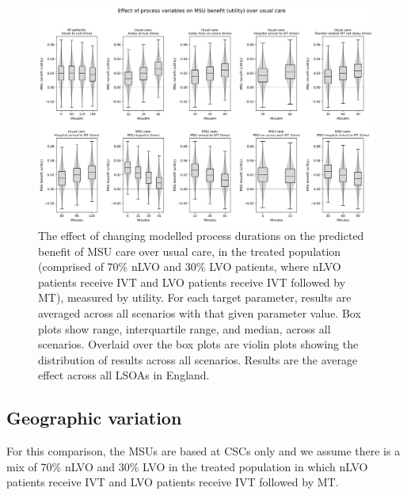 \begin{figure}[h!]
    \centering
    \includegraphics[width=1\linewidth]{images/msu_net_utility_benefit.png}
    \caption{The effect of changing modelled process durations on the predicted benefit of MSU care over usual care, in the treated population (comprised of 70\% nLVO and 30\% LVO patients, where nLVO patients receive IVT and LVO patients receive IVT followed by MT), measured by utility. For each target parameter, results are averaged across all scenarios with that given parameter value. Box plots show range, interquartile range, and median, across all scenarios. Overlaid over the box plots are violin plots showing the distribution of results across all scenarios. Results are the average effect across all LSOAs in England.}
    \label{fig:scenarios_utility}
\end{figure}

\subsection{Geographic variation}

For this comparison, the MSUs are based at CSCs only and we assume there is a mix of 70\% nLVO and 30\% LVO in the treated population in which nLVO patients receive IVT and LVO patients receive IVT followed by MT.

